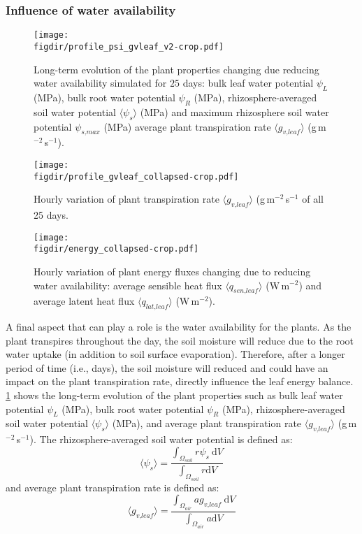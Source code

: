 \subsubsection*{Influence of water availability}

\begin{figure}[p]
	\centering
	\texttt{[image: \\figdir/profile\_psi\_gvleaf\_v2-crop.pdf]}
	\caption{Long-term evolution of the plant properties changing due reducing water availability simulated for $25$ days:  bulk leaf water potential $\psi_L$ (MPa), bulk root water potential $\psi_R$ (MPa), rhizosphere-averaged soil water potential $\langle \psi_s \rangle$ (MPa) and maximum rhizosphere soil water potential $\psi_{\textit{s,max}}$ (MPa)  average plant transpiration rate $\langle g_{\textit{v,leaf}} \rangle$ (g\,m$^{-2}$\,s$^{-1}$). }
	\label{fig:profile_psi_gvleaf}
\end{figure}

\begin{figure}[p]
	\centering
	\texttt{[image: \\figdir/profile\_gvleaf\_collapsed-crop.pdf]}
	\caption{Hourly variation of plant transpiration rate $\langle g_{\textit{v,leaf}} \rangle$ (g\,m$^{-2}$\,s$^{-1}$ of all 25 days.}
	\label{fig:profile_gvleaf_collapsed}
\end{figure}

\begin{figure}[p]
	\centering
	\texttt{[image: \\figdir/energy\_collapsed-crop.pdf]}
	\caption{Hourly variation of plant energy fluxes changing due to reducing water availability:  average sensible heat flux $\langle q_{\textit{sen,leaf}} \rangle$ (W\,m$^{-2}$) and  average latent heat flux $\langle q_{\textit{lat,leaf}} \rangle$ (W\,m$^{-2}$). }
	\label{fig:energy_collapsed}
\end{figure}

A final aspect that can play a role is the water availability for the plants. As the plant transpires throughout the day, the soil moisture will reduce due to the root water uptake (in addition to soil surface evaporation). Therefore, after a longer period of time (i.e., days), the soil moisture will reduced and could have an impact on the plant transpiration rate, directly influence the leaf energy balance.  \cref{fig:profile_psi_gvleaf} shows the long-term evolution of the plant properties such as bulk leaf water potential $\psi_L$ (MPa), bulk root water potential $\psi_R$ (MPa), rhizosphere-averaged soil water potential $\langle \psi_s \rangle$ (MPa), and average plant transpiration rate $\langle g_{\textit{v,leaf}} \rangle$ (g\,m$^{-2}$\,s$^{-1}$). The rhizosphere-averaged soil water potential is defined as:
\begin{equation}
\langle \psi_s \rangle = \frac{\int_{\Omega_{\textit{soil}}} r \psi_s~\mathrm{d}V}{\int_{\Omega_{\textit{soil}}} r \mathrm{d}V }
\end{equation}
and average plant transpiration rate is defined as:
\begin{equation}
\langle g_{\textit{v,leaf}} \rangle= \frac{\int_{\Omega_{\textit{air}}} a g_{\textit{v,leaf}}~\mathrm{d}V}{\int_{\Omega_{\textit{air}}} a \mathrm{d}V }
\end{equation}

